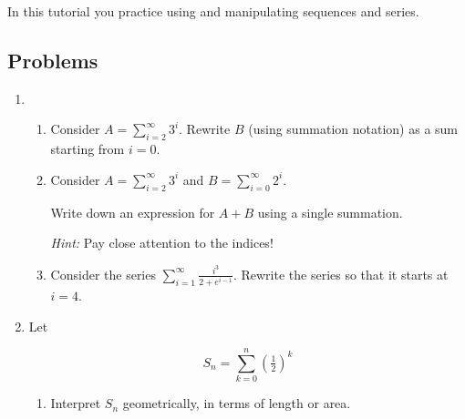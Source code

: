 		
\begin{objectives}
	In this tutorial you practice using and manipulating sequences and series.
\end{objectives}

	\vspace{-1em}
\subsection*{Problems}
\begin{enumerate}
	\item 
    
        \begin{enumerate}
			\item Consider $A=\displaystyle \sum_{i=2}^\infty 3^{i}$. Rewrite $B$ (using summation notation) as
			a sum starting from $i=0$.
            \item %
            Consider  $A=\displaystyle \sum_{i=2}^\infty 3^{i}$ and
             $
			 B=\displaystyle \sum_{i=0}^\infty 2^{i}$.

            Write down an expression for $A+B$ using a single summation.

			\emph{Hint:} Pay close attention to the indices!

            \item %
            Consider the series $\displaystyle \sum_{i=1}^\infty \frac{i^3}{2+e^{i-1}}$. Rewrite the series so that it starts at $i=4$.
            
            
        \end{enumerate}%
        
        \item %

        Let 
        
        \[S_n = \sum^n_{k=0} \left(\tfrac{1}{2}\right)^k\]

        \begin{enumerate}
            \item Interpret $S_n$ geometrically, in terms of length or area.


\end{enumerate}
\end{enumerate}
